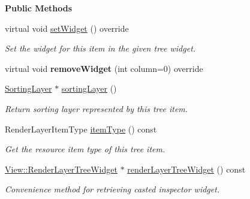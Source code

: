 \begin{Indent}\textbf{ Public Methods}\par
\begin{DoxyCompactItemize}
\item 
virtual void \mbox{\hyperlink{classrev_1_1_view_1_1_render_layer_item_a47da9e3b2ab654727f724a951b061acf}{set\+Widget}} () override
\begin{DoxyCompactList}\small\item\em Set the widget for this item in the given tree widget. \end{DoxyCompactList}\item 
\mbox{\label{classrev_1_1_view_1_1_render_layer_item_a0046ff7c701247f9c39fb9f69cbef0ee}} 
virtual void {\bfseries remove\+Widget} (int column=0) override
\item 
\mbox{\label{classrev_1_1_view_1_1_render_layer_item_ac113c25f5ac263e0491dea0b4e1114c3}} 
\mbox{\hyperlink{structrev_1_1_sorting_layer}{Sorting\+Layer}} $\ast$ \mbox{\hyperlink{classrev_1_1_view_1_1_render_layer_item_ac113c25f5ac263e0491dea0b4e1114c3}{sorting\+Layer}} ()
\begin{DoxyCompactList}\small\item\em Return sorting layer represented by this tree item. \end{DoxyCompactList}\item 
\mbox{\label{classrev_1_1_view_1_1_render_layer_item_a0134949ec527cc9c236c70c64ee76897}} 
Render\+Layer\+Item\+Type \mbox{\hyperlink{classrev_1_1_view_1_1_render_layer_item_a0134949ec527cc9c236c70c64ee76897}{item\+Type}} () const
\begin{DoxyCompactList}\small\item\em Get the resource item type of this tree item. \end{DoxyCompactList}\item 
\mbox{\label{classrev_1_1_view_1_1_render_layer_item_a8b5bc6f8d2885830e98a9bb90f33dc11}} 
\mbox{\hyperlink{classrev_1_1_view_1_1_render_layer_tree_widget}{View\+::\+Render\+Layer\+Tree\+Widget}} $\ast$ \mbox{\hyperlink{classrev_1_1_view_1_1_render_layer_item_a8b5bc6f8d2885830e98a9bb90f33dc11}{render\+Layer\+Tree\+Widget}} () const
\begin{DoxyCompactList}\small\item\em Convenience method for retrieving casted inspector widget. \end{DoxyCompactList}\end{DoxyCompactItemize}
\end{Indent}
